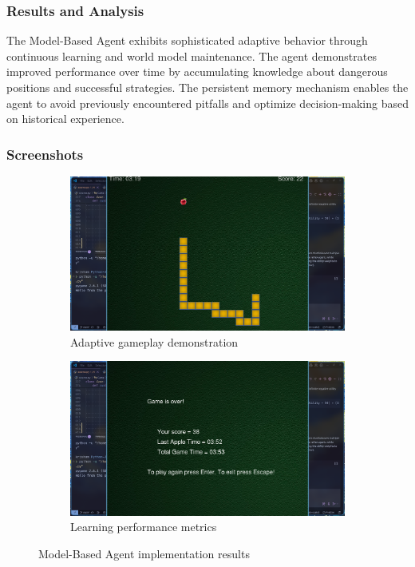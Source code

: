 \documentclass[11pt,a4paper]{article}
\begin{document}
\subsubsection{Results and Analysis}
The Model-Based Agent exhibits sophisticated adaptive behavior through continuous learning and world model maintenance. The agent demonstrates improved performance over time by accumulating knowledge about dangerous positions and successful strategies. The persistent memory mechanism enables the agent to avoid previously encountered pitfalls and optimize decision-making based on historical experience.

\subsubsection{Screenshots}
\begin{figure}[H]
    \centering
    \begin{subfigure}{0.6\textwidth}
        \includegraphics[width=\textwidth]{ss/model_based_play.png}
        \caption{Adaptive gameplay demonstration}
    \end{subfigure}
    \hfill
    \begin{subfigure}{0.6\textwidth}
        \includegraphics[width=\textwidth]{ss/model_based_score.png}
        \caption{Learning performance metrics}
    \end{subfigure}
    \caption{Model-Based Agent implementation results}
\end{figure}
\end{document}
